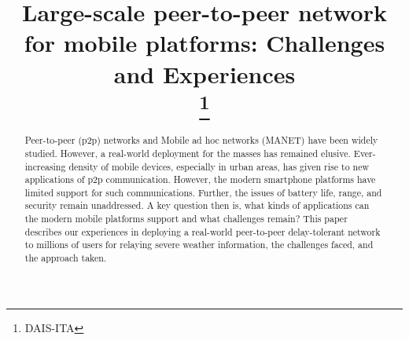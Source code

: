 \documentclass[conference]{IEEEtran}
\begin{document}
\title{Large-scale peer-to-peer network for mobile platforms: Challenges and Experiences\\
\thanks{DAIS-ITA}
}

\author{
\and
{}
\and
{}
\and
{}
\and
{}
\and
{}
}

\maketitle

\begin{abstract}
Peer-to-peer (p2p) networks and Mobile ad hoc networks (MANET) have been widely studied. However, a real-world deployment for the masses has remained elusive. Ever-increasing density of mobile devices, especially in urban areas, has given rise to new applications of p2p communication. However, the modern smartphone platforms have limited support for such communications. Further, the issues of battery life, range, and security remain unaddressed. A key question then is, what kinds of applications can the modern mobile platforms support and what challenges remain? This paper describes our experiences in deploying a real-world peer-to-peer delay-tolerant network to millions of users for relaying severe weather information, the challenges faced, and the approach taken.
\end{abstract}
\end{document}
